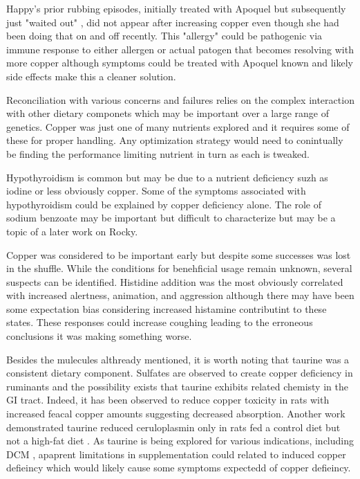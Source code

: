 Happy's prior rubbing episodes, initially treated with Apoquel but 
subsequently just "waited out" , did not appear
after increasing copper even though she had been doing that on and
off recently. This "allergy" could be  pathogenic via 
immune response to either allergen or actual patogen 
that becomes resolving with more copper although symptoms
could be treated with Apoquel known and likely side effects
make this a cleaner solution. 

Reconciliation with various concerns and failures
relies on the complex interaction with other dietary componets
which may be important over a large range of genetics. 
Copper was just one of many nutrients explored and
it requires some of these for proper handling.
Any optimization strategy would need to conintually
be finding the performance limiting nutrient
in turn as each is tweaked. 


Hypothyroidism is common but may be due to a nutrient
deficiency suzh as iodine or less obviously copper.
Some of the symptoms associated with hypothyroidism
could be explained by copper deficiency alone.
The role of sodium benzoate may be important but
difficult to characterize  but may be a topic of a later
work on Rocky.

Copper was considered to be important early but despite
some successes was lost in the shuffle. While the conditions
for benehficial usage remain unknown, several suspects
can be identified. Histidine addition was the most
obviously correlated with increased
alertness, animation, and aggression although there
may have been some expectation bias considering increased
histamine contributint to these states. These responses
could increase coughing leading to the erroneous
conclusions it was making something worse.    

Besides the mulecules althready mentioned, it is worth
noting that taurine was a consistent dietary component.
Sulfates are observed to create copper deficiency in ruminants
and the possibility exists that taurine exhibits related chemisty
in the GI tract. Indeed, it has been observed to reduce
copper toxicity in rats with increased feacal copper
amounts \cite{PMID9609396} suggesting decreased
absorption. 
Another work demonstrated taurine reduced ceruloplasmin only
in rats fed a  control diet but not a high-fat diet
\cite{Krol2020}.
As taurine is being explored for various indications,
including DCM \cite{PMC9257265},
apaprent limitations in supplementation could  related
to induced copper defieincy which would likely cause some
symptoms expectedd of copper defieincy.


